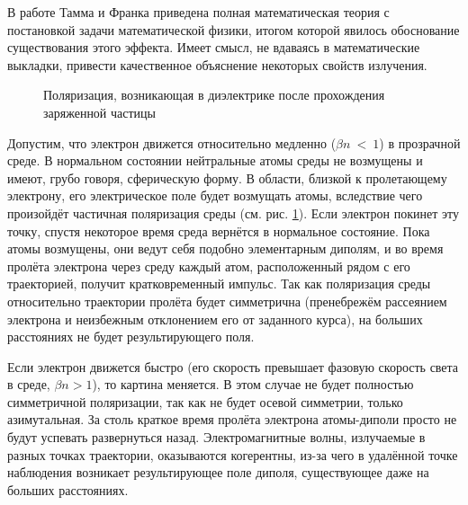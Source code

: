 \documentclass[12pt,a4paper]{report} %
\begin{document}
В работе Тамма и Франка приведена полная математическая теория с постановкой задачи математической физики, итогом которой явилось обоснование существования этого эффекта. Имеет смысл, не вдаваясь в математические выкладки, привести качественное объяснение некоторых свойств излучения. 

\begin{figure}[th]
	\noindent{}
	\caption{Поляризация, возникающая в диэлектрике после прохождения заряженной частицы}
	\label{pic:Polarisation}
\end{figure}

Допустим, что электрон движется относительно медленно ($\beta n~<~1$) в прозрачной среде. В нормальном состоянии нейтральные атомы среды не возмущены и имеют, грубо говоря, сферическую форму. В области, близкой к пролетающему электрону, его электрическое поле будет возмущать атомы, вследствие чего произойдёт частичная поляризация среды (см. рис. \ref{pic:Polarisation}). Если электрон покинет эту точку, спустя некоторое время среда вернётся в нормальное состояние. Пока атомы возмущены, они ведут себя подобно элементарным диполям, и во время пролёта электрона через среду каждый атом, расположенный рядом с его траекторией, получит кратковременный импульс. Так как поляризация среды относительно траектории пролёта будет симметрична (пренебрежём рассеянием электрона и неизбежным отклонением его от заданного курса), на больших расстояниях не будет результирующего поля.

Если электрон движется быстро (его скорость превышает фазовую скорость света в среде, $\beta n > 1$), то картина меняется. В этом случае не будет полностью симметричной поляризации, так как не будет осевой симметрии, только азимутальная. За столь краткое время пролёта электрона атомы-диполи просто не будут успевать развернуться назад.
Электромагнитные волны, излучаемые в разных точках траектории, оказываются когерентны, из-за чего в удалённой точке наблюдения возникает результирующее поле диполя, существующее даже на больших расстояниях. 
\end{document}

